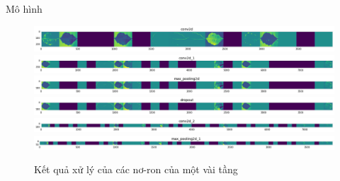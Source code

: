 \documentclass{beamer}
\begin{document}
\begin{frame}[allowframebreaks]{Mô hình}
	\begin{figure}[H]
		\centering
		\includegraphics[scale=0.2]{images/image5}
		\includegraphics[scale=0.2]{images/image6}
		\includegraphics[scale=0.2]{images/image4}
		\includegraphics[scale=0.2]{images/image8}
		\includegraphics[scale=0.2]{images/image12}
		\includegraphics[scale=0.2]{images/image14}
		\caption{Kết quả xử lý của các nơ-ron của một vài tầng}
	\end{figure}

\end{frame}
\end{document}
